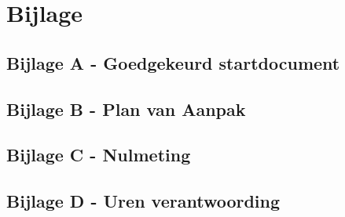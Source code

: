 \section{Bijlage}

\subsection{Bijlage A - Goedgekeurd startdocument}

\fbox{}

\subsection{Bijlage B - Plan van Aanpak}

\fbox{}

\subsection{Bijlage C - Nulmeting}

\fbox{}

\subsection{Bijlage D - Uren verantwoording}

\fbox{}